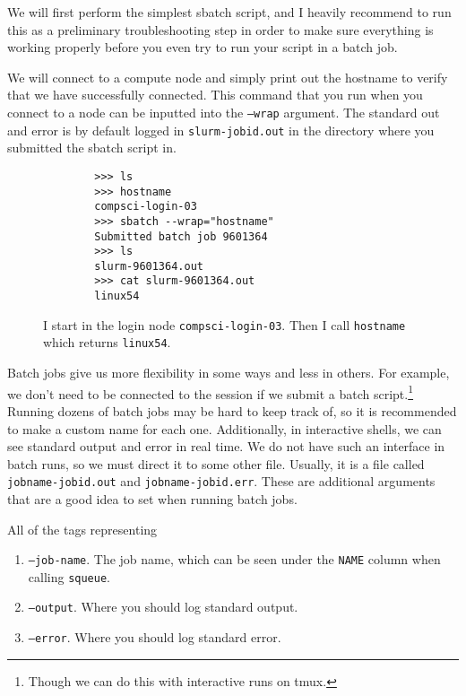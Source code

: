   We will first perform the simplest sbatch script, and I heavily recommend to run this as a preliminary troubleshooting step in order to make sure everything is working properly before you even try to run your script in a batch job.

  \begin{theorem}
    We will connect to a compute node and simply print out the hostname to verify that we have successfully connected. This command that you run when you connect to a node can be inputted into the \texttt{--wrap} argument. The standard out and error is by default logged in \texttt{slurm-jobid.out} in the directory where you submitted the sbatch script in. 

    \begin{figure}[H]
      \centering 
      \begin{lstlisting}
        >>> ls
        >>> hostname                
        compsci-login-03
        >>> sbatch --wrap="hostname"
        Submitted batch job 9601364
        >>> ls
        slurm-9601364.out
        >>> cat slurm-9601364.out 
        linux54 
      \end{lstlisting}
      \caption{I start in the login node \texttt{compsci-login-03}. Then I call \texttt{hostname} which returns \texttt{linux54}.}
    \end{figure} 
  \end{theorem}

  Batch jobs give us more flexibility in some ways and less in others. For example, we don't need to be connected to the session if we submit a batch script.\footnote{Though we can do this with interactive runs on tmux.} Running dozens of batch jobs may be hard to keep track of, so it is recommended to make a custom name for each one. Additionally, in interactive shells, we can see standard output and error in real time. We do not have such an interface in batch runs, so we must direct it to some other file. Usually, it is a file called \texttt{jobname-jobid.out} and \texttt{jobname-jobid.err}. These are additional arguments that are a good idea to set when running batch jobs. 

  \begin{definition}
    All of the tags representing 
    \begin{enumerate}
      \item \texttt{--job-name}. The job name, which can be seen under the \texttt{NAME} column when calling \texttt{squeue}. 
      \item \texttt{--output}. Where you should log standard output. 
      \item \texttt{--error}. Where you should log standard error. 
    \end{enumerate}
  \end{definition}


